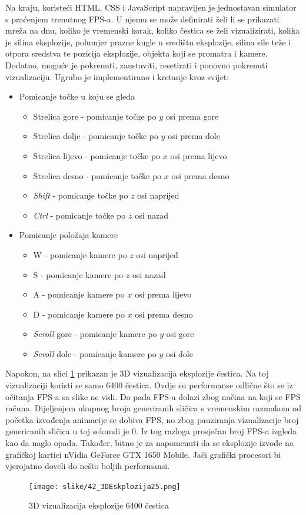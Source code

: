 \documentclass{foi}
\begin{document}
Na kraju, koristeći HTML, CSS i JavaScript napravljen je jednostavan simulator s praćenjem trenutnog FPS-a. U njemu se može definirati želi li se prikazati mreža na dnu, koliko je vremenski korak, koliko čestica se želi vizualizirati, kolika je silina eksplozije, polumjer prazne kugle u središtu eksplozije, silina sile teže i otpora sredstva te pozicija eksplozije, objekta koji se promatra i kamere. Dodatno, moguće je pokrenuti, zaustaviti, resetirati i ponovno pokrenuti vizualizaciju. Ugrubo je implementirano i kretanje kroz svijet:
\begin{itemize}
	\item Pomicanje točke u koju se gleda
	\begin{itemize}
		\item Strelica gore - pomicanje točke po $y$ osi prema gore
		\item Strelica dolje - pomicanje točke po $y$ osi prema dole
		\item Strelica lijevo - pomicanje točke po $x$ osi prema lijevo
		\item Strelica desno - pomicanje točke po $x$ osi prema desno
		\item \textit{Shift} - pomicanje točke po $z$ osi naprijed
		\item \textit{Ctrl} - pomicanje točke po $z$ osi nazad
	\end{itemize}
	\item Pomicanje položaja kamere
	\begin{itemize}
		\item W - pomicanje kamere po $z$ osi naprijed
		\item S - pomicanje kamere po $z$ osi nazad
		\item A - pomicanje kamere po $x$ osi prema lijevo
		\item D - pomicanje kamere po $x$ osi prema desno
		\item \textit{Scroll} gore - pomicanje kamere po $y$ osi gore
		\item \textit{Scroll} dole - pomicanje kamere po $y$ osi dole
	\end{itemize}
	
	
\end{itemize}

Napokon, na slici \ref{fig:3D_25} prikazan je 3D vizualizacija eksplozije čestica. Na toj vizualizaciji koristi se samo 6400 čestica. Ovdje su performanse odlične što se iz očitanja FPS-a sa slike ne vidi. Do pada FPS-a dolazi zbog načina na koji se FPS računa. Dijeljenjem ukupnog broja generiranih sličica s vremenskim razmakom od početka izvođenja animacije se dobiva FPS, no zbog pauziranja vizualizacije broj generiranih sličica u toj sekundi je 0. Iz tog razloga prosječan broj FPS-a izgleda kao da naglo opada. Također, bitno je za napomenuti da se eksplozije izvode na grafičkoj kartici nVidia GeForce GTX 1650 Mobile. Jači grafički procesori bi vjerojatno doveli do nešto boljih performansi.
\\
\begin{figure}[H]
	\centering
	\texttt{[image: slike/42\_3DEskplozija25.png]}
	\captionsetup{justification=centering}
	\caption{3D vizualizacija eksplozije 6400 čestica}
	\label{fig:3D_25}
\end{figure}
\end{document}

